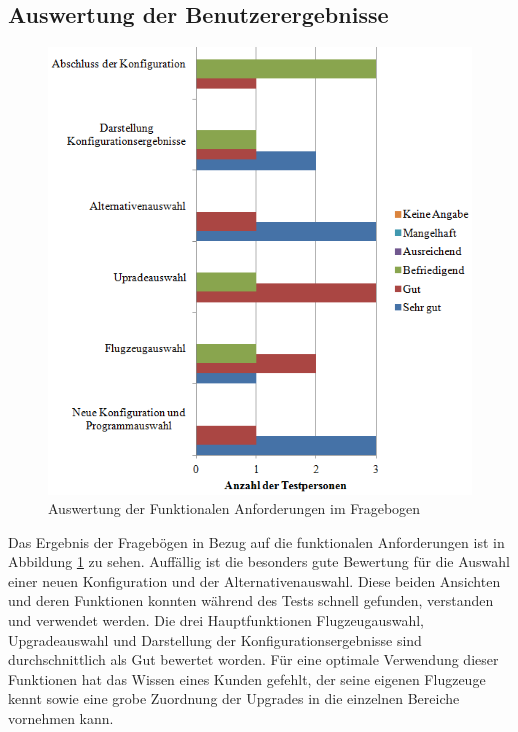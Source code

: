\subsection{Auswertung der Benutzerergebnisse}
\begin{figure}
\centering
\includegraphics[width=\hsize]{images/bewertung_tablet}
\caption{Auswertung der Funktionalen Anforderungen im Fragebogen}
\label{bewertungTablet}
\end{figure}
Das Ergebnis der Fragebögen in Bezug auf die funktionalen Anforderungen ist in Abbildung \ref{bewertungTablet} zu sehen. Auffällig ist die besonders gute Bewertung für die Auswahl einer neuen Konfiguration und der Alternativenauswahl. Diese beiden Ansichten und deren Funktionen konnten während des Tests schnell gefunden, verstanden und verwendet werden. Die drei Hauptfunktionen Flugzeugauswahl, Upgradeauswahl und Darstellung der Konfigurationsergebnisse sind durchschnittlich als Gut bewertet worden. Für eine optimale Verwendung dieser Funktionen hat das Wissen eines Kunden gefehlt, der seine eigenen Flugzeuge kennt sowie eine grobe Zuordnung der Upgrades in die einzelnen Bereiche vornehmen kann. \par

